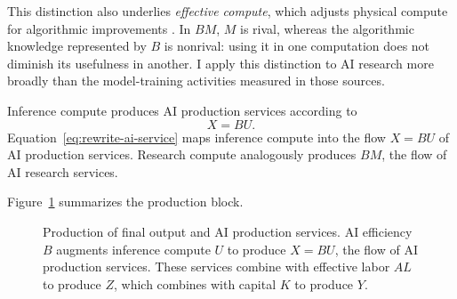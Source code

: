 This distinction also underlies \emph{effective compute}, which adjusts
physical compute for algorithmic improvements
\citep{hoetal2024algorithms,jones2026future}. In $BM$, $M$ is rival,
whereas the algorithmic knowledge represented by $B$ is nonrival: using it
in one computation does not diminish its usefulness in another. I apply
this distinction to AI research more broadly than the model-training
activities measured in those sources.

Inference compute produces AI production services according to
\begin{equation}
 X=BU.
 \label{eq:rewrite-ai-service}
\end{equation}
Equation~\eqref{eq:rewrite-ai-service} maps inference compute into the flow $X=BU$ of AI production services. Research compute analogously produces $BM$, the flow of AI research services.

Figure~\ref{fig:rewrite-model-flow} summarizes the production block.

\begin{figure}[H]
 \centering
 \caption{Production of final output and AI production services. AI efficiency $B$ augments inference compute $U$ to produce $X=BU$, the flow of AI production services. These services combine with effective labor $AL$ to produce $Z$, which combines with capital $K$ to produce $Y$.}
 \label{fig:rewrite-model-flow}
\end{figure}


